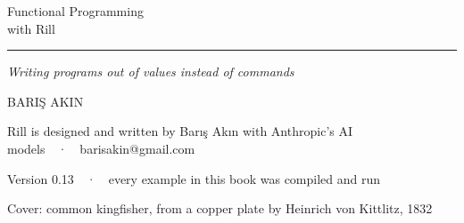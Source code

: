 {\begin{titlepage}
  \vspace{0.9cm}
  {\fontsize{33}{38}\selectfont Functional Programming\\[2pt] with Rill\par}
  \vspace{14pt}
  {\color{rillteal}\rule{0.30\textwidth}{1.2pt}}\par
  \vspace{14pt}
  {\large\itshape Writing programs out of values instead of commands\par}
  \vfill
  {\sffamily\fontsize{15}{18}\selectfont\MakeUppercase{Barış Akın}\par}
  \vspace{6pt}
  {\footnotesize\color{black!55}Rill is designed and written by Barış Akın with
   Anthropic's AI models\ \ ·\ \ barisakin@gmail.com\par}
  \vspace{10pt}
  {\footnotesize\color{black!55}Version 0.13\ \ ·\ \ every example in this book was
   compiled and run\par}
  \vspace{1.5cm}
  {\scriptsize\color{black!45}Cover: common kingfisher, from a copper plate by
   Heinrich von Kittlitz, 1832\par}
  \vspace{1.1cm}
  \noindent{}
  \restoregeometry
  \end{titlepage}}
